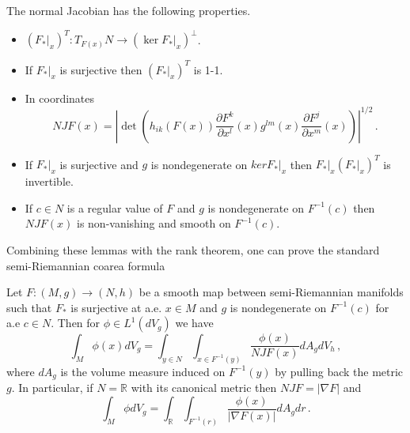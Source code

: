 \begin{lemma}
The normal Jacobian has the following properties.
\begin{itemize}
\item $(F_*|_x)^T:T_{F(x)}N\rightarrow (\ker F_*|_x)^\perp$.
\item If $F_*|_x$ is surjective then $(F_*|_x)^T$ is 1-1.
\item In coordinates
\begin{equation}
NJF(x)=\left|\det\left(h_{ik}(F(x))\frac{\partial F^k}{\partial x^l}(x)g^{lm}(x)\frac{\partial F^j}{\partial x^m}(x)\right)\right|^{1/2}\,.
\end{equation}
\item  If $F_*|_x$ is surjective and $g$ is nondegenerate on $ker F_*|_x$ then $F_*|_x(F_*|_x)^T$ is invertible.
\item If $c\in N$ is a regular value of $F$ and $g$ is nondegenerate on $F^{-1}(c)$ then $NJF(x)$ is non-vanishing and smooth on $F^{-1}(c)$.
\end{itemize}
\end{lemma}

Combining these lemmas with the rank theorem, one can prove the standard semi-Riemannian coarea formula
\begin{theorem}
Let $F:(M,g)\rightarrow (N,h)$ be a smooth map between semi-Riemannian manifolds such that $F_*$ is surjective at a.e. $x\in M$ and $g$ is nondegenerate on $F^{-1}(c)$ for a.e $c\in N$.  Then for $\phi\in L^1(dV_g)$ we have
\begin{equation}
\int_M\phi(x)dV_g=\int_{y\in N}\int_{x\in F^{-1}(y)}\frac{\phi(x)}{NJF(x)}dA_g dV_h\,,
\end{equation}
where $dA_g$ is the volume measure induced on $F^{-1}(y)$ by pulling back the metric $g$.  In particular, if $N=\mathbb{R}$ with its canonical metric then $NJF=|\nabla F|$ and 
\begin{equation}
\int_M \phi dV_g=\int_\mathbb{R}\int_{F^{-1}(r)}\frac{\phi(x)}{|\nabla F(x)|} dA_g dr\,.
\end{equation}
\end{theorem}

